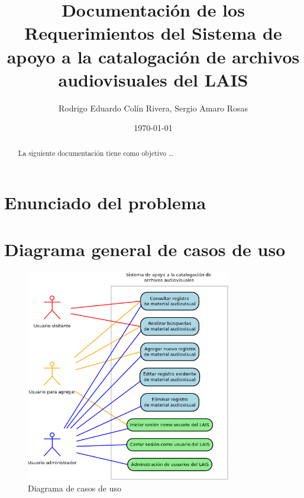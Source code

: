 \documentclass[10pt,letterpaper]{article}
\begin{document}
\title{Documentación de los Requerimientos del Sistema de apoyo a la catalogación de archivos audiovisuales del LAIS}
\author{Rodrigo Eduardo Colín Rivera, Sergio Amaro Rosas}
\date{\today}
\maketitle

\setcounter{secnumdepth}{0} %
\setcounter{tocdepth}{0} %
\graphicspath{{../Diagramas/}{../Screenshots}} %

\begin{abstract}
La siguiente documentación tiene como objetivo \ldots
\end{abstract}

\section{Enunciado del problema}

\section{Diagrama general de casos de uso}
\begin{figure}[H]
	\centering
	\includegraphics[width=0.8\textwidth]{CasosDeUso.png}
	\caption{Diagrama de casos de uso}
	\label{fig:caso_de_uso}
\end{figure}
\end{document}
